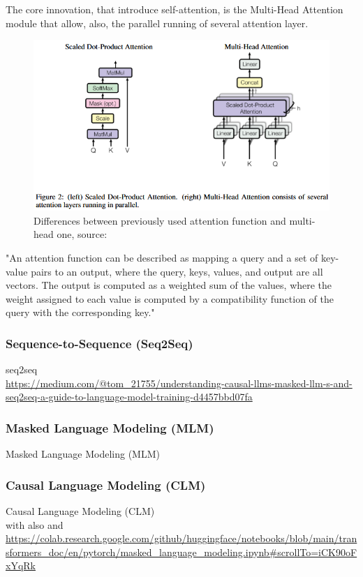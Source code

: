 \documentclass[12pt]{article}
\begin{document}
The core innovation, that introduce self-attention, is the Multi-Head Attention module that allow, also, the parallel running of several attention layer.
	\begin{figure}[H]
    \centering
            \includegraphics[width=1\textwidth]{attention.png}
    \caption{Differences between previously used attention function and multi-head one, source: \cite{vaswani2023attentionneed}}
    \end{figure}
"An attention function can be described as mapping a query and a set of key-value pairs to an output, where the query, keys, values, and output are all vectors. The output is computed as a weighted sum of the values, where the weight assigned to each value is computed by a compatibility function of the query with the corresponding key."\cite{vaswani2023attentionneed}
    
    	\subsubsection{Sequence-to-Sequence (Seq2Seq)}
seq$2$seq\\ \url{https://medium.com/@tom_21755/understanding-causal-llms-masked-llm-s-and-seq2seq-a-guide-to-language-model-training-d4457bbd07fa}\\
    	
        \subsubsection{Masked Language Modeling (MLM)}    	
    	Masked Language Modeling (MLM) \cite{devlin2019bertpretrainingdeepbidirectional}
    	
    	\subsubsection{Causal Language Modeling (CLM)}
Causal Language Modeling (CLM) \cite{vaswani2023attentionneed}\\
with also 
and \url{https://colab.research.google.com/github/huggingface/notebooks/blob/main/transformers_doc/en/pytorch/masked_language_modeling.ipynb#scrollTo=iCK90oFxYqRk}\\
\end{document}
